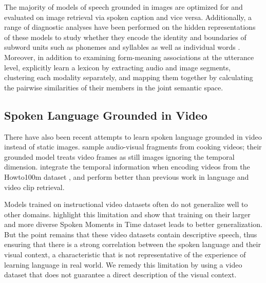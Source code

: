 The majority of models of speech grounded in images are optimized for and evaluated on
image retrieval via spoken caption and vice versa. Additionally, a range of
diagnostic analyses have been performed on the hidden
representations of these models to study whether they encode 
the identity and boundaries of subword units such as phonemes
and syllables \cite{alishahi-etal-2017-encoding, harwath2019towards,
  khorrami_2021} as well as individual words
\cite{chrupala-etal-2017-representations,havard2019word}. Moreover, in
addition to examining form-meaning associations at the utterance
level, \citet{harwath-glass-2017-learning} explicitly learn a lexicon by
extracting audio and image segments, clustering each modality
separately, and mapping them together by calculating the pairwise
similarities of their members in the joint semantic space.

\subsection{Spoken Language Grounded in Video}
\label{sec:video}
There have also been recent attempts to learn spoken language grounded
in video instead of static images.  \citet{boggust2019grounding}
sample audio-visual fragments from cooking videos;  their
grounded model treats video frames as still images ignoring the temporal dimension.
\citet{rouditchenko2020avlnet} integrate the temporal information when
encoding videos from the Howto100m dataset \cite{miech2019howto100m},
and perform better than previous work in language and video clip
retrieval.

Models trained on instructional video datasets often do not
generalize well to other domains. \citet{monfort2021spokenmoments}
highlight this limitation and show that training on their larger and
more diverse Spoken Moments in Time dataset leads to better
generalization.  But the point remains that these video datasets contain
descriptive speech, thus ensuring that there is a strong correlation
between the spoken language and their visual context, a characteristic
that is not representative of the experience of learning language in
 real world. We remedy this limitation by using a video dataset that does 
 not guarantee a direct description of the visual context. 

